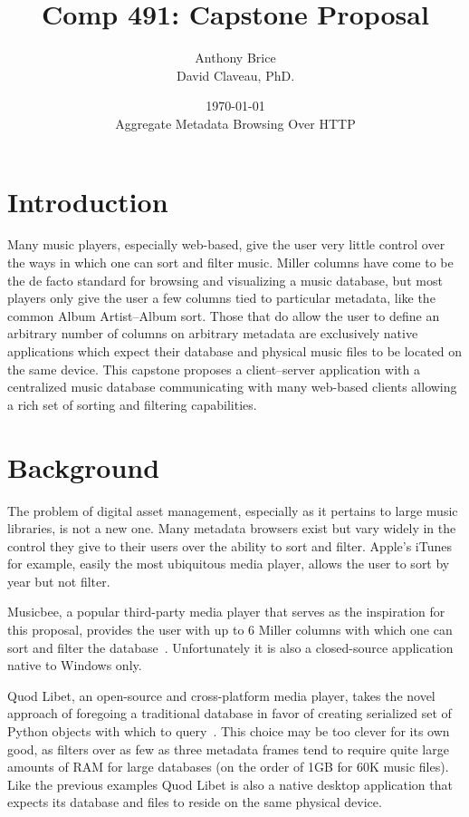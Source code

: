 \documentclass{abrice}
\title{Comp 491: Capstone Proposal}
\author{Anthony Brice\protect\\\medskip David Claveau, PhD.}
\date{\today\protect\\ \bigskip Aggregate Metadata Browsing Over HTTP}
\begin{document}
\maketitle

\section{Introduction}

Many music players, especially web-based, give the user very little control
over the ways in which one can sort and filter music. Miller columns have come
to be the de facto standard for browsing and visualizing a music database, but
most players only give the user a few columns tied to particular metadata, like
the common Album Artist--Album sort. Those that do allow the user to define an
arbitrary number of columns on arbitrary metadata are exclusively native
applications which expect their database and physical music files to be located
on the same device. This capstone proposes a client--server application with a
centralized music database communicating with many web-based clients allowing a
rich set of sorting and filtering capabilities.

\section{Background}

The problem of digital asset management, especially as it pertains to large
music libraries, is not a new one. Many metadata browsers exist but vary widely
in the control they give to their users over the ability to sort and
filter. Apple's iTunes for example, easily the most ubiquitous media player,
allows the user to sort by year but not filter.

Musicbee, a popular third-party media player that serves as the inspiration for
this proposal, provides the user with up to 6 Miller columns with which one can
sort and filter the database~\cite{musicbee}. Unfortunately it is also a
closed-source application native to Windows only.

Quod Libet, an open-source and cross-platform media player, takes the novel
approach of foregoing a traditional database in favor of creating serialized set
of Python objects with which to query~\cite{quodlibet}. This choice may be too
clever for its own good, as filters over as few as three metadata frames tend to
require quite large amounts of RAM for large databases (on the order of 1GB for
60K music files). Like the previous examples Quod Libet is also a native desktop
application that expects its database and files to reside on the same physical
device.
\end{document}
